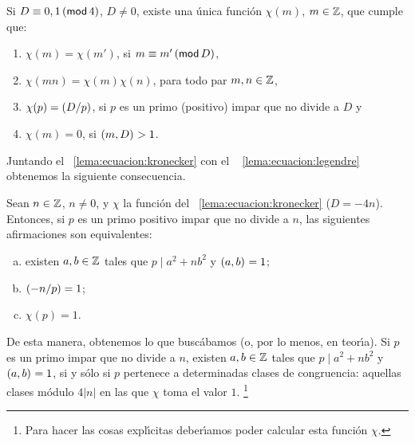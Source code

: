 \begin{lemaEcuacion}\label{lema:ecuacion:kronecker}
	Si $D\equiv 0,1\tmodulo[4]$, $D\neq 0$, existe una \'unica
	funci\'on $\chi(m)$, $m\in\Enteros$, que cumple que:
	\begin{enumerate}[(1)]
		\item\label{item:ecuacion:kronecker:clases}
			$\chi(m)=\chi(m')$, si $m\equiv m'\tmodulo[D]$,
		\item\label{item:ecuacion:kronecker:multiplicativo}
			$\chi(mn)=\chi(m)\chi(n)$, para todo par
			$m,n\in\Enteros$,
		\item\label{item:ecuacion:kronecker:legendre}
			$\chi(p)=\tlegendre D{p}$, si $p$ es un primo
			(positivo) impar que no divide a $D$ y
		\item\label{item:ecuacion:kronecker:cero}
			$\chi(m)=0$, si $\mcd{m,D}>1$.
	\end{enumerate}
\end{lemaEcuacion}

Juntando el \lemaname~\ref{lema:ecuacion:kronecker} con el \lemaname~%
\ref{lema:ecuacion:legendre} obtenemos la siguiente consecuencia.

\begin{teoEcuacion}\label{teo:ecuacion:kronecker}
	Sean $n\in\Enteros$, $n\neq 0$, y $\chi$ la funci\'on del
	\lemaname~\ref{lema:ecuacion:kronecker} ($D=-4n$). Entonces,
	si $p$ es un primo positivo impar que no divide a $n$, las siguientes
	afirmaciones son equivalentes:
	\begin{enumerate}[(a)]
		\item\label{item:ecuacion:kronecker:equivalencias:divide}
			existen $a,b\in\Enteros$ tales que
			$p\mid a^2+nb^2$ y $\mcd{a,b}=1$;
		\item\label{item:ecuacion:kronecker:equivalencias:legendre}
			$\tlegendre{-n} p=1$;
		\item\label{item:ecuacion:kronecker:equivalencias:nucleo}
			$\chi(p)=1$.
	\end{enumerate}
\end{teoEcuacion}

De esta manera, obtenemos lo que busc\'abamos (o, por lo menos, en
teor\'{\i}a). Si $p$ es un primo impar que no divide a $n$, existen
$a,b\in\Enteros$ tales que $p\mid a^2+nb^2$ y $\mcd{a,b}=1$, si y s\'olo si
$p$ pertenece a determinadas clases de congruencia: aquellas clases m\'odulo
$4|n|$ en las que $\chi$ toma el valor $1$.%
\footnote{
	Para hacer las cosas expl\'{\i}citas deber\'{\i}amos poder
	calcular esta funci\'on $\chi$.
}

